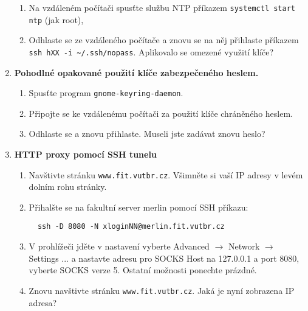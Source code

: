 \begin{enumerate}
\begin{enumerate}
      \item Na vzdáleném počítači spusťte službu NTP příkazem {\tt systemctl
        start ntp} (jak root),

      \item Odhlaste se ze vzdáleného počítače a znovu se na něj přihlaste
        příkazem {\tt ssh hXX -i \textasciitilde/.ssh/nopass}. Aplikovalo se
        omezené využití klíče?

    \end{enumerate}


  \item {\bf Pohodlné opakované použití klíče zabezpečeného heslem.}

    \begin{enumerate}

      \item Spusťte program {\tt gnome-keyring-daemon}.

      \item Připojte se ke vzdálenému počítači za použití klíče chráněného
        heslem.

      \item Odhlaste se a znovu přihlaste. Museli jste zadávat znovu heslo?

    \end{enumerate}

      \item {\bf HTTP proxy pomocí SSH tunelu}

    \begin{enumerate}

      \item Navštivte stránku {\tt www.fit.vutbr.cz}. Všimněte si vaší IP adresy v levém dolním rohu stránky.

      \item Přihalšte se na fakultní server merlin pomocí SSH příkazu:
\begin{verbatim}
  ssh -D 8080 -N xloginNN@merlin.fit.vutbr.cz
\end{verbatim}

      \item V prohlížeči jděte v nastavení vyberte Advanced $\rightarrow$ Network $\rightarrow$
        Settings ... a nastavte adresu pro SOCKS
        Host na 127.0.0.1 a port 8080, vyberte SOCKS verze 5. Ostatní možnosti
        ponechte prázdné.

      \item Znovu navštivte stránku {\tt www.fit.vutbr.cz}. Jaká je nyní zobrazena IP adresa?

    \end{enumerate}

\end{enumerate}


